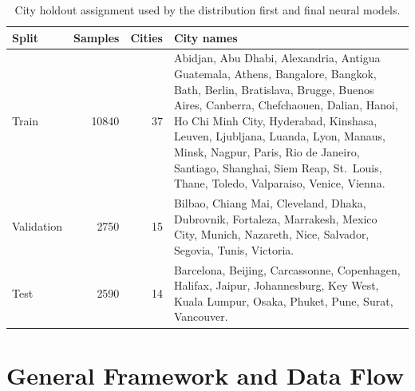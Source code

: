 \begin{table}[ht]
\centering
\scriptsize
\caption{City holdout assignment used by the distribution first and final neural models.}
\label{tab:split_city_assignment}
\begin{tabularx}{\textwidth}{lrrX}
\toprule
Split & Samples & Cities & City names \\
\midrule
Train & 10840 & 37 & Abidjan, Abu Dhabi, Alexandria, Antigua Guatemala,
Athens, Bangalore, Bangkok, Bath, Berlin, Bratislava, Brugge, Buenos Aires,
Canberra, Chefchaouen, Dalian, Hanoi, Ho Chi Minh City, Hyderabad, Kinshasa,
Leuven, Ljubljana, Luanda, Lyon, Manaus, Minsk, Nagpur, Paris,
Rio de Janeiro, Santiago, Shanghai, Siem Reap, St.~Louis, Thane, Toledo,
Valparaiso, Venice, Vienna. \\
Validation & 2750 & 15 & Bilbao, Chiang Mai, Cleveland, Dhaka, Dubrovnik,
Fortaleza, Marrakesh, Mexico City, Munich, Nazareth, Nice, Salvador, Segovia,
Tunis, Victoria. \\
Test & 2590 & 14 & Barcelona, Beijing, Carcassonne, Copenhagen, Halifax,
Jaipur, Johannesburg, Key West, Kuala Lumpur, Osaka, Phuket, Pune, Surat,
Vancouver. \\
\bottomrule
\end{tabularx}
\normalsize
\end{table}

\section{General Framework and Data Flow}
\label{sec:framework_data_flow}


